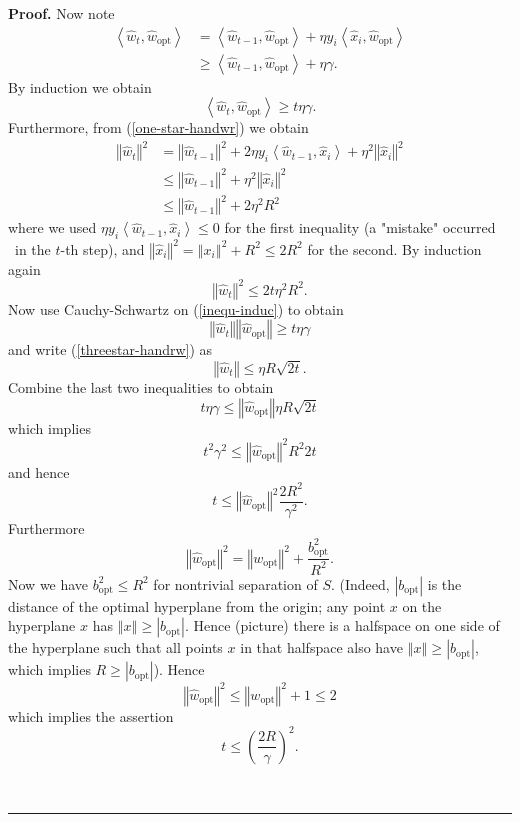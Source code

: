 \documentclass[11pt,twoside]{article}%
\theoremstyle{change}
\newenvironment{proof}[1][Proof]{\textbf{#1.} }{\ \rule{0.5em}{0.5em}}
\begin{document}
\begin{proof}
Now note
\begin{align*}
\left\langle \hat{w}_{t},\hat{w}_{\mathrm{opt}}\right\rangle  & =\left\langle
\hat{w}_{t-1},\hat{w}_{\mathrm{opt}}\right\rangle +\eta y_{i}\left\langle
\hat{x}_{i},\hat{w}_{\mathrm{opt}}\right\rangle \\
& \geq\left\langle \hat{w}_{t-1},\hat{w}_{\mathrm{opt}}\right\rangle
+\eta\gamma.
\end{align*}
By induction we obtain
\begin{equation}
\left\langle \hat{w}_{t},\hat{w}_{\mathrm{opt}}\right\rangle \geq t\eta
\gamma.\label{inequ-induc}%
\end{equation}
Furthermore, from (\ref{one-star-handwr}) we obtain
\begin{align*}
\left\Vert \hat{w}_{t}\right\Vert ^{2}  & =\left\Vert \hat{w}_{t-1}\right\Vert
^{2}+2\eta y_{i}\left\langle \hat{w}_{t-1},\hat{x}_{i}\right\rangle +\eta
^{2}\left\Vert \hat{x}_{i}\right\Vert ^{2}\\
& \leq\left\Vert \hat{w}_{t-1}\right\Vert ^{2}+\eta^{2}\left\Vert \hat{x}%
_{i}\right\Vert ^{2}\\
& \leq\left\Vert \hat{w}_{t-1}\right\Vert ^{2}+2\eta^{2}R^{2}%
\end{align*}
where we used $\eta y_{i}\left\langle \hat{w}_{t-1},\hat{x}_{i}\right\rangle
\leq0$ for the first inequality (a "mistake" occurred \ in the $t$-th step),
and $\left\Vert \hat{x}_{i}\right\Vert ^{2}=\left\Vert x_{i}\right\Vert
^{2}+R^{2}\leq2R^{2}$ for the second. By induction again
\begin{equation}
\left\Vert \hat{w}_{t}\right\Vert ^{2}\leq2t\eta^{2}R^{2}%
.\label{threestar-handrw}%
\end{equation}
Now use Cauchy-Schwartz on (\ref{inequ-induc}) to obtain
\[
\left\Vert \hat{w}_{t}\right\Vert \left\Vert \hat{w}_{\mathrm{opt}}\right\Vert
\geq t\eta\gamma
\]
and write (\ref{threestar-handrw}) as
\[
\left\Vert \hat{w}_{t}\right\Vert \leq\eta R\sqrt{2t}.
\]
Combine the last two inequalities to obtain%
\[
t\eta\gamma\leq\left\Vert \hat{w}_{\mathrm{opt}}\right\Vert \eta R\sqrt{2t}%
\]
which implies
\[
t^{2}\gamma^{2}\leq\left\Vert \hat{w}_{\mathrm{opt}}\right\Vert ^{2}R^{2}2t
\]
and hence
\[
t\leq\left\Vert \hat{w}_{\mathrm{opt}}\right\Vert ^{2}\frac{2R^{2}}{\gamma
^{2}}.
\]
Furthermore
\[
\left\Vert \hat{w}_{\mathrm{opt}}\right\Vert ^{2}=\left\Vert w_{\mathrm{opt}%
}\right\Vert ^{2}+\frac{b_{\mathrm{opt}}^{2}}{R^{2}}.
\]
Now we have $b_{\mathrm{opt}}^{2}\leq R^{2}$ for nontrivial separation of $S$.
(Indeed, $\left\vert b_{\mathrm{opt}}\right\vert $ is the distance of the
optimal hyperplane from the origin; any point $x$ on the hyperplane $x$ has
$\left\Vert x\right\Vert \geq\left\vert b_{\mathrm{opt}}\right\vert $. Hence
(picture) there is a halfspace on one side of the hyperplane such that all
points $x$ in that halfspace also have $\left\Vert x\right\Vert \geq\left\vert
b_{\mathrm{opt}}\right\vert $, which implies $R\geq\left\vert b_{\mathrm{opt}%
}\right\vert $). Hence
\[
\left\Vert \hat{w}_{\mathrm{opt}}\right\Vert ^{2}\leq\left\Vert
w_{\mathrm{opt}}\right\Vert ^{2}+1\leq2
\]
which implies the assertion
\[
t\leq\left(  \frac{2R}{\gamma}\right)  ^{2}.
\]

\end{proof}
\end{document}
